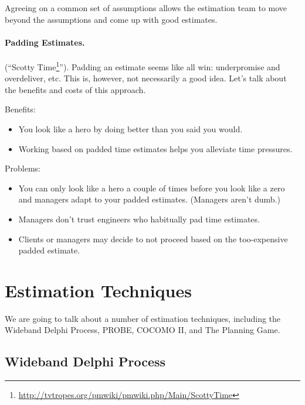 Agreeing on a common set of assumptions allows the estimation team to 
move beyond the assumptions and come up with good estimates.


\paragraph{Padding Estimates.}  (``Scotty Time\footnote{\url{http://tvtropes.org/pmwiki/pmwiki.php/Main/ScottyTime}}''). Padding an estimate seems like all win: underpromise and overdeliver, etc. This is, however, not necessarily a good idea. Let's talk about the benefits and costs of this approach.


Benefits:
\begin{itemize}
\item You look like a hero by doing better than you said you would.
\item Working based on padded time estimates helps you alleviate time pressures.
\end{itemize}

Problems:
\begin{itemize}
\item You can only look like a hero a couple of times before you look like a zero and managers adapt to your padded estimates. (Managers aren't dumb.)
\item Managers don't trust engineers who habitually pad time estimates.
\item Clients or managers may decide to not proceed based on the too-expensive padded estimate.
\end{itemize}

\section*{Estimation Techniques}
We are going to talk about a number of estimation techniques, including the
Wideband Delphi Process, PROBE, COCOMO II, and The Planning Game.

\subsection*{Wideband Delphi Process}
 
